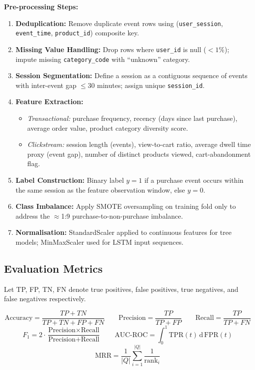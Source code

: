 \documentclass[12pt,a4paper]{article}
\begin{document}
\textbf{Pre-processing Steps:}
\begin{enumerate}[leftmargin=1.4cm, itemsep=2pt]
  \item \textbf{Deduplication:} Remove duplicate event rows using
        (\texttt{user\_session}, \texttt{event\_time}, \texttt{product\_id}) composite key.
  \item \textbf{Missing Value Handling:} Drop rows where \texttt{user\_id} is null ($< 1\%$);
        impute missing \texttt{category\_code} with ``unknown'' category.
  \item \textbf{Session Segmentation:} Define a session as a contiguous sequence of events
        with inter-event gap $\leq 30$ minutes; assign unique \texttt{session\_id}.
  \item \textbf{Feature Extraction:}
        \begin{itemize}[itemsep=1pt]
          \item \emph{Transactional:} purchase frequency, recency (days since last purchase),
                average order value, product category diversity score.
          \item \emph{Clickstream:} session length (events), view-to-cart ratio,
                average dwell time proxy (event gap), number of distinct products viewed,
                cart-abandonment flag.
        \end{itemize}
  \item \textbf{Label Construction:} Binary label $y=1$ if a purchase event occurs within
        the same session as the feature observation window, else $y=0$.
  \item \textbf{Class Imbalance:} Apply SMOTE oversampling on training fold only to address
        the $\approx$1:9 purchase-to-non-purchase imbalance.
  \item \textbf{Normalisation:} StandardScaler applied to continuous features for tree
        models; MinMaxScaler used for LSTM input sequences.
\end{enumerate}

\subsection{Evaluation Metrics}

Let TP, FP, TN, FN denote true positives, false positives, true negatives, and false negatives respectively.

\[
\text{Accuracy} = \frac{TP + TN}{TP + TN + FP + FN}
\qquad
\text{Precision} = \frac{TP}{TP + FP}
\qquad
\text{Recall} = \frac{TP}{TP + FN}
\]
\[
F_1 = 2 \cdot \frac{\text{Precision} \times \text{Recall}}{\text{Precision} + \text{Recall}}
\qquad
\text{AUC-ROC} = \int_0^1 \text{TPR}(t)\,\mathrm{d}\,\text{FPR}(t)
\]
\[
\text{MRR} = \frac{1}{|Q|}\sum_{i=1}^{|Q|} \frac{1}{\text{rank}_i}
\]
\end{document}
